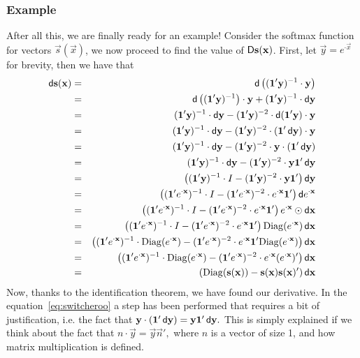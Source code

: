 \documentclass[pdflatex,sn-mathphys-num]{sn-jnl}%
\theoremstyle{thmstyleone}%
\theoremstyle{thmstyletwo}%
\theoremstyle{thmstylethree}%
\begin{document}
\subsubsection{Example}
After all this, we are finally ready for an example! Consider the softmax
function for vectors \(\vec s(\vec x)\), we now proceed to find the value of
\(\mathop{}\!\mathsf D\mathbf{s}(\mathbf{x})\). First, let \(\vec y = e^{{\cdot}\vec x}\) for brevity,
then we have that
\begin{eqnarray}
\dif\vec s(\vec x)
&=& \dif\left((\vec 1' \vec y)^{-1} \cdot \vec y\right)\nonumber\\
&=& \dif\left((\vec 1' \vec y)^{-1}\right) \cdot \vec y
    + (\vec 1' \vec y)^{-1} \cdot \dif\vec y\nonumber\\
&=& (\vec 1' \vec y)^{-1} \cdot \dif\vec y
    - (\vec 1' \vec y)^{-2} \cdot \dif(\vec 1' \vec y) \cdot \vec y\nonumber\\
&=& (\vec 1' \vec y)^{-1} \cdot \dif\vec y
    - (\vec 1' \vec y)^{-2} \cdot (\vec 1' \dif\vec y) \cdot \vec y\nonumber\\
&=& (\vec 1' \vec y)^{-1} \cdot \dif\vec y
    - (\vec 1' \vec y)^{-2} \cdot \vec y \cdot (\vec 1' \dif\vec y)\nonumber\\
&=& (\vec 1' \vec y)^{-1} \cdot \dif\vec y
    - (\vec 1' \vec y)^{-2} \cdot \vec y \vec 1' \dif\vec y\label{eq:switcheroo}\\
&=& \left((\vec 1' \vec y)^{-1} \cdot I
    - (\vec 1' \vec y)^{-2} \cdot \vec y \vec 1'\right) \dif\vec y\nonumber\\
&=& \left((\vec 1' e^{{\cdot}\vec x})^{-1} \cdot I
    - (\vec 1' e^{{\cdot}\vec x})^{-2} \cdot e^{{\cdot}\vec x} \vec 1'\right)
    \dif e^{{\cdot}\vec x}\nonumber\\
&=& \left((\vec 1' e^{{\cdot}\vec x})^{-1} \cdot I
    - (\vec 1' e^{{\cdot}\vec x})^{-2} \cdot e^{{\cdot}\vec x} \vec 1'\right)
    e^{{\cdot}\vec x} \hadam \dif \vec x\nonumber\\
&=& \left((\vec 1' e^{{\cdot}\vec x})^{-1} \cdot I
    - (\vec 1' e^{{\cdot}\vec x})^{-2} \cdot e^{{\cdot}\vec x} \vec 1'\right)
    \Diag(e^{{\cdot}\vec x}) \dif \vec x\nonumber\\
&=& \left((\vec 1' e^{{\cdot}\vec x})^{-1} \cdot \Diag(e^{{\cdot}\vec x})
    - (\vec 1' e^{{\cdot}\vec x})^{-2} \cdot e^{{\cdot}\vec x} \vec 1' \Diag(e^{{\cdot}\vec x})\right)
    \dif \vec x\nonumber\\
&=& \left((\vec 1' e^{{\cdot}\vec x})^{-1} \cdot \Diag(e^{{\cdot}\vec x})
    - (\vec 1' e^{{\cdot}\vec x})^{-2} \cdot e^{{\cdot}\vec x} (e^{{\cdot}\vec x})'\right)
    \dif \vec x\nonumber\\
&=& (\Diag(\vec s(\vec x)) - \vec s(\vec x) \vec s(\vec x)') \dif\vec x\nonumber
\end{eqnarray}
Now, thanks to the identification theorem, we have found our derivative.  In the
equation~\ref{eq:switcheroo} a step has been performed that requires a bit of
justification, i.e. the fact that \(\mathbf{y} \cdot (\mathbf{1}' \mathop{}\!\mathsf d\mathbf{y}) = \mathbf{y}
\mathbf{1}' \mathop{}\!\mathsf d\mathbf{y}.\) This is simply explained if we think about the fact that
\(n \cdot \vec y = \vec y \vec n',\) where \(n\) is a vector of size 1, and how
matrix multiplication is defined.
\end{document}
